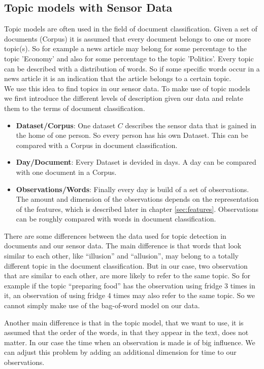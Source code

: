 \documentclass[11pt,a4paper]{article}
\begin{document}
\subsection{Topic models with Sensor Data}
Topic models are often used in the field of document classification. Given a set of documents (Corpus) it is assumed that every document belongs to one or more topic(s). So for example a news article may belong for some percentage to the topic 'Economy' and also for some percentage to the topic 'Politics'. Every topic can be described with a distribution of words. So if some specific words occur in a news article it is an indication that the article belongs to a certain topic.\\
We use this idea to find topics in our sensor data. To make use of topic models we first introduce the different levels of description given our data and relate them to the terms of document classification.
\begin{itemize}
 \item \textbf{Dataset/Corpus}: One dataset $C$ describes the sensor data that is gained in the home of one person. So every person has his own Dataset. This can be compared with a Corpus in document classification.
 \item \textbf{Day/Document}: Every Dataset is devided in days. A day can be compared with one document in a Corpus.
 \item \textbf{Observations/Words}: Finally every day is build of a set of observations. The amount and dimension of the observations depends on the representation of the features, which is described later in chapter \ref{sec:features}. Observations can be roughly compared with words in document classification.
\end{itemize}




There are some differences between the data used for topic detection in documents and our sensor data. The main difference is that words that look similar to each other, like ``illusion'' and ``allusion'', may belong to a totally different topic in the document classification. But in our case, two observation that are similar to each other, are more likely to refer to the same topic. So for example if the topic ``preparing food'' has the observation using fridge 3 times in it, an observation of using fridge 4 times may also refer to the same topic. So we cannot simply make use of the bag-of-word model on our data.

Another main difference is that in the topic model, that we want to use, it is assumed that the order of the words, in that they appear in the text, does not matter. In our case the time when an observation is made is of big influence. We can adjust this problem by adding an additional dimension for time to our observations. %
\end{document}
